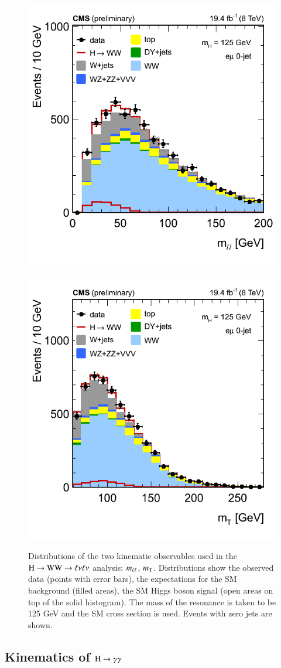 \begin{figure}[!htbp]
\begin{center}
\centerline{
\includegraphics[width=0.50\linewidth]{figures/wwpresel_0j_mh125_massll.png}
~~~~~
\includegraphics[width=0.50\linewidth]{figures/wwpresel_0j_mh125_mt.png}
}
\caption{ 
  Distributions of the two kinematic observables
  used in the $\mathrm{H}\to\mathrm{W}\mathrm{W}\to\ell\nu\ell\nu$ analysis: $m_{\ell\ell}$, $m_{\mathrm{T}}$.  Distributions
  show the observed data (points with error bars), the expectations
  for the SM background (filled areas), the SM Higgs boson signal
  (open areas on top of the solid histogram).  The
  mass of the resonance is taken to be 125 GeV and the SM cross
  section is used.  Events with zero jets are shown.  
\label{fig:hwwkinematics} }
\end{center}
\end{figure}


\subsection{Kinematics of $\mathrm{H}\to\gamma\gamma$}
\label{sec:hggkinematics}

